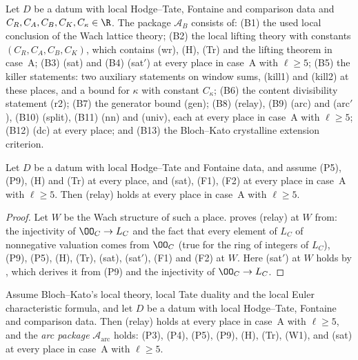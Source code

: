 \begin{definition}\label{pf:linkN-adm:def-AB}
Let $D$ be a datum with local Hodge--Tate, Fontaine and comparison data and $C_R,C_A,C_B,C_K,C_\kappa\in\R$. The package
$\mathcal A_B$ consists of: (B1) the used local conclusion of the Wach lattice theory; (B2) the local lifting theory with
constants $(C_R,C_A,C_B,C_K)$, which contains (wr), (H), (Tr) and the lifting theorem in case~A; (B3) (sat) and (B4) (sat$'$)
at every place in case~A with $\ell\ge5$; (B5) the killer statements: two auxiliary statements on window sums, (kill1) and
(kill2) at these places, and a bound for $\kappa$ with constant $C_\kappa$; (B6) the content divisibility statement (r2);
(B7) the generator bound (gen); (B8) (relay), (B9) (arc) and (arc$'$), (B10) (split), (B11) (nn) and (univ), each at every
place in case~A with $\ell\ge5$; (B12) (dc) at every place; and (B13) the Bloch--Kato crystalline extension criterion.
\end{definition}

\begin{lemma}\label{pf:linkN-adm:relaylem}
Let $D$ be a datum with local Hodge--Tate and Fontaine data, and assume (P5), (P9), (H) and (Tr) at every place, and (sat),
(F1), (F2) at every place in case~A with $\ell\ge5$. Then (relay) holds at every place in case~A with $\ell\ge5$.
\end{lemma}

\begin{proof}
Let $W$ be the Wach structure of such a place.  proves (relay)
at $W$ from: the injectivity of $\OO_C\to L_C$ and the fact that every element of $L_C$ of nonnegative valuation comes from
$\OO_C$ (true for the ring of integers of $L_C$), (P9), (P5), (H), (Tr), (sat), (sat$'$), (F1) and (F2) at $W$. Here (sat$'$) at
$W$ holds by , which derives it from (P9) and the injectivity
of $\OO_C\to L_C$.
\end{proof}

\begin{proposition}\label{pf:linkN-adm:relay}
Assume Bloch--Kato's local theory, local Tate duality and the local Euler characteristic formula, and let $D$ be a datum with
local Hodge--Tate, Fontaine and comparison data. Then (relay) holds at every place in case~A with $\ell\ge5$, and the
\emph{arc package} $\mathcal A_{\mathrm{arc}}$ holds: (P3), (P4), (P5), (P9), (H), (Tr), (W1), and (sat) at every place in
case~A with $\ell\ge5$.
\end{proposition}


